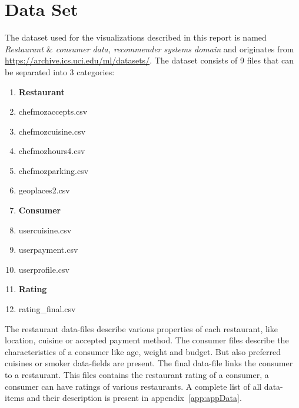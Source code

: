 \section{Data Set}\label{sec:data}

The dataset used for the visualizations described in this report is named \emph{Restaurant $\&$ consumer data, recommender systems domain} and originates from \href{https://archive.ics.uci.edu/ml/datasets/Restaurant+\&+consumer+data}{https://archive.ics.uci.edu/ml/datasets/}.
The dataset consists of 9 files that can be separated into 3 categories:
\begin{enumerate}
  \item[] \textbf{Restaurant}
  \item chefmozaccepts.csv
  \item chefmozcuisine.csv
  \item chefmozhours4.csv
  \item chefmozparking.csv
  \item geoplaces2.csv
  \item[] \textbf{Consumer}
  \item usercuisine.csv
  \item userpayment.csv
  \item userprofile.csv
  \item[] \textbf{Rating}
  \item rating\_final.csv
\end{enumerate}
The restaurant data-files describe various properties of each restaurant, like location, cuisine or accepted payment method.
The consumer files describe the characteristics of a consumer like age, weight and budget.
But also preferred cuisines or smoker data-fields are present.
The final data-file links the consumer to a restaurant.
This files contains the restaurant rating of a consumer, a consumer can have ratings of various restaurants.
A complete list of all data-items and their description is present in appendix~\ref{app:appData}.


